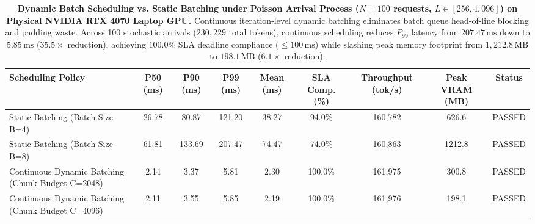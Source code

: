 \documentclass[journal]{IEEEtran}
\begin{document}
\begin{table}[t]
\centering
\small
\caption{\textbf{Dynamic Batch Scheduling vs. Static Batching under Poisson Arrival Process ($N=100$ requests, $L \in [256, 4{,}096]$) on Physical NVIDIA RTX 4070 Laptop GPU.} Continuous iteration-level dynamic batching eliminates batch queue head-of-line blocking and padding waste. Across 100 stochastic arrivals ($230{,}229$ total tokens), continuous scheduling reduces $P_{99}$ latency from $207.47\,\text{ms}$ down to $5.85\,\text{ms}$ ($35.5\times$ reduction), achieving $100.0\%$ SLA deadline compliance ($\le 100\,\text{ms}$) while slashing peak memory footprint from $1{,}212.8\,\text{MB}$ to $198.1\,\text{MB}$ ($6.1\times$ reduction).}
\label{tab:dynamic_batching_benchmarks}
\begin{tabular}{lcccccccc}
\toprule
\textbf{Scheduling Policy} & \textbf{P50 (ms)} & \textbf{P90 (ms)} & \textbf{P99 (ms)} & \textbf{Mean (ms)} & \textbf{SLA Comp. (\%)} & \textbf{Throughput (tok/s)} & \textbf{Peak VRAM (MB)} & \textbf{Status} \\
\midrule
Static Batching (Batch Size B=4)                     & 26.78 & 80.87 & 121.20 & 38.27 & 94.0\% & 160,782 & 626.6 & PASSED \\
Static Batching (Batch Size B=8)                     & 61.81 & 133.69 & 207.47 & 74.47 & 74.0\% & 160,863 & 1212.8 & PASSED \\
Continuous Dynamic Batching (Chunk Budget C=2048)    & 2.14 & 3.37 & 5.81 & 2.30 & 100.0\% & 161,975 & 300.8 & PASSED \\
Continuous Dynamic Batching (Chunk Budget C=4096)    & 2.11 & 3.55 & 5.85 & 2.19 & 100.0\% & 161,976 & 198.1 & PASSED \\
\bottomrule
\end{tabular}
\end{table}
\end{document}
